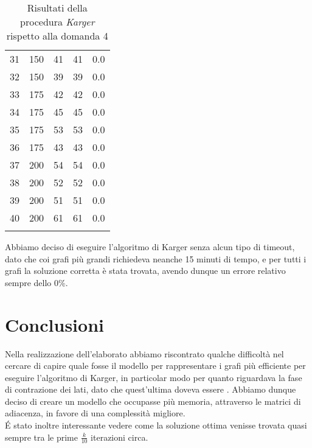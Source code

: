 \begin{center}
\begin{longtable}{|c|c|c|c|c|}
		31 & 150 & 41 & 41 & 0.0 \\
		32 & 150 & 39 & 39 & 0.0 \\
		33 & 175 & 42 & 42 & 0.0 \\
		34 & 175 & 45 & 45 & 0.0 \\
		35 & 175 & 53 & 53 & 0.0 \\
		36 & 175 & 43 & 43 & 0.0 \\
		37 & 200 & 54 & 54 & 0.0 \\
		38 & 200 & 52 & 52 & 0.0 \\
		39 & 200 & 51 & 51 & 0.0 \\
		40 & 200 & 61 & 61 & 0.0 \\
		\hline
		\caption{Risultati della procedura \textit{Karger} rispetto alla domanda 4}
		\label{error-results}
	\end{longtable}
\end{center}\vspace{-40pt}

Abbiamo deciso di eseguire l'algoritmo di Karger senza alcun tipo di timeout, dato che coi grafi più grandi richiedeva neanche 15 minuti di tempo, e per tutti i grafi la soluzione corretta è stata trovata, avendo dunque un errore relativo sempre dello 0\%.

\section{Conclusioni}
Nella realizzazione dell'elaborato abbiamo riscontrato qualche difficoltà nel cercare di capire quale fosse il modello per rappresentare i grafi più efficiente per eseguire l'algoritmo di Karger, in particolar modo per quanto riguardava la fase di contrazione dei lati, dato che quest'ultima doveva essere . Abbiamo dunque deciso di creare un modello che occupasse più memoria, attraverso le matrici di adiacenza, in favore di una complessità migliore.\\
\'E stato inoltre interessante vedere come la soluzione ottima venisse trovata quasi sempre tra le prime $\frac{k}{10}$ iterazioni circa.